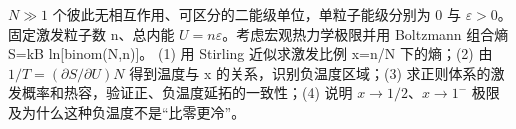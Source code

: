 \(N\gg 1\) 个彼此无相互作用、可区分的二能级单位，单粒子能级分别为 0 与 \(\varepsilon >0\)。固定激发粒子数 n、总内能 \(U=n\varepsilon \)。考虑宏观热力学极限并用 Boltzmann 组合熵 S=kB ln[binom(N,n)]。
(1) 用 Stirling 近似求激发比例 x=n/N 下的熵；(2) 由 \(1/T=(\partial S/\partial U)N\) 得到温度与 x 的关系，识别负温度区域；(3) 求正则体系的激发概率和热容，验证正、负温度延拓的一致性；(4) 说明 \(x\to 1/2\)、\(x\to 1^{-}\) 极限及为什么这种负温度不是“比零更冷”。
